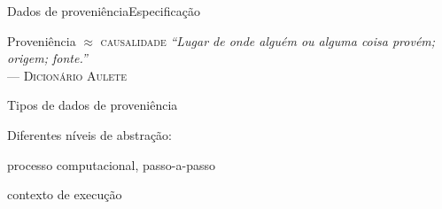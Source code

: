 \documentclass[12pt,compress,final]{beamer}
\newcommand{\nologo}{\setbeamertemplate{logo}{}} %
\begin{document}
{\nologo
\begin{frame}{Dados de proveniência}{Especificação}

\begin{alertblock}{Proveniência $\approx$ \textsc{causalidade}}
\textit{``Lugar de onde alguém ou alguma coisa provém; origem; fonte.''} \\
\hspace*{\fill}--- \textsc{Dicionário Aulete}
\end{alertblock}

\vfill

\begin{exampleblock}{Tipos de dados de proveniência}
\centerline{Diferentes níveis de abstração:}
\begin{description}[retrospectiva]
\item[prospectiva] \alert{processo computacional}, passo-a-passo
\item[retrospectiva] contexto de \alert{execução}
\end{description}
\end{exampleblock}


\end{frame}
}

\end{document}
